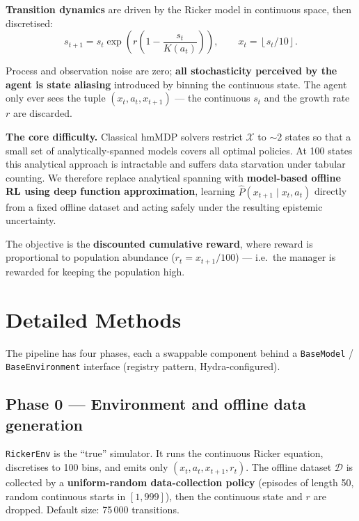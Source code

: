 \documentclass[11pt]{article}
\begin{document}
\textbf{Transition dynamics} are driven by the Ricker model in continuous
space, then discretised:
\begin{equation}
s_{t+1} = s_t \exp\!\left( r\left( 1 - \frac{s_t}{K(a_t)} \right) \right),
\qquad
x_{t} = \left\lfloor s_t / 10 \right\rfloor .
\end{equation}

Process and observation noise are zero; \textbf{all stochasticity perceived
by the agent is state aliasing} introduced by binning the continuous state.
The agent only ever sees the tuple $(x_t, a_t, x_{t+1})$ --- the continuous
$s_t$ and the growth rate $r$ are discarded.

\textbf{The core difficulty.} Classical hmMDP solvers restrict $\mathcal{X}$
to ${\sim}2$ states so that a small set of analytically-spanned models covers
all optimal policies. At 100 states this analytical approach is intractable
and suffers data starvation under tabular counting. We therefore replace
analytical spanning with \textbf{model-based offline RL using deep function
approximation}, learning $\hat{P}(x_{t+1}\mid x_t,a_t)$ directly from a fixed
offline dataset and acting safely under the resulting epistemic uncertainty.

The objective is the \textbf{discounted cumulative reward}, where reward is
proportional to population abundance ($r_t = x_{t+1}/100$) --- i.e.\ the
manager is rewarded for keeping the population high.

\section{Detailed Methods}

The pipeline has four phases, each a swappable component behind a
\texttt{BaseModel} / \texttt{BaseEnvironment} interface (registry pattern,
Hydra-configured).

\subsection{Phase 0 --- Environment and offline data generation}
\texttt{RickerEnv} is the ``true'' simulator. It runs the continuous Ricker
equation, discretises to 100 bins, and emits only
$(x_t, a_t, x_{t+1}, r_t)$. The offline dataset $\mathcal{D}$ is collected by
a \textbf{uniform-random data-collection policy} (episodes of length 50,
random continuous starts in $[1, 999]$), then the continuous state and $r$
are dropped. Default size: 75\,000 transitions.
\end{document}
